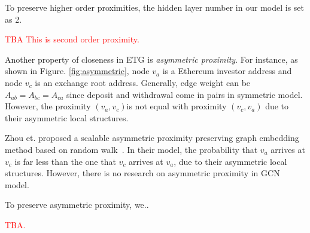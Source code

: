 To preserve higher order proximities, the hidden layer number in our model is set as 2.

\textcolor{red}{TBA This is second order proximity.}

Another property of closeness in ETG is \emph{asymmetric proximity}. For instance, as shown in Figure. \ref{fig:asymmetric}, node $v_a$ is a Ethereum investor address and node $v_c$ is an exchange root address. Generally, edge weight can be $A_{ab}=A_{bc}=A_{ca}$ since deposit and withdrawal come in pairs in symmetric model. However, the proximity $(v_a,v_c)$is not equal with proximity $(v_c,v_a)$ due to their asymmetric local structures.


 Zhou et. proposed a scalable asymmetric proximity preserving graph embedding method based on random walk~\cite{zhou2017scalable}. In their model, the probability that $v_a$ arrives at $v_c$ is far less than the one that $v_c$ arrives at $v_a$, due to their asymmetric local structures. However, there is no research on asymmetric proximity in GCN model.
 
 To preserve asymmetric proximity, we..
 
 \textcolor{red}{TBA.}


